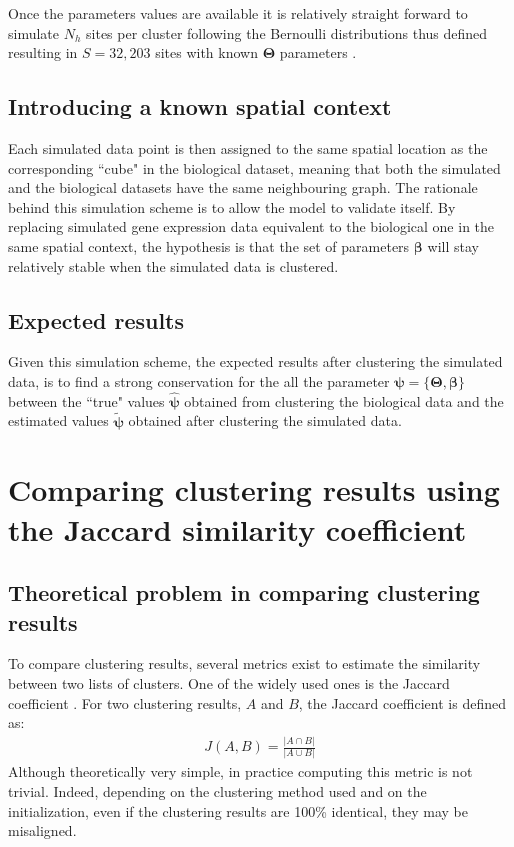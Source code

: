 	Once the parameters values are available it is relatively straight forward to simulate $N_h$ sites per cluster following the Bernoulli distributions thus defined resulting in $S=32,203$ sites with known $\boldsymbol{\Theta}$ parameters .
	\subsection{Introducing a known spatial context}\label{subsec:simul_spatial}
	Each simulated data point is then assigned to the same spatial location as the corresponding ``cube" in the biological dataset, meaning that both the simulated and the biological datasets have the same neighbouring graph. The rationale behind this simulation scheme is to allow the model to validate itself. By replacing simulated gene expression data equivalent to the biological one in the same spatial context, the hypothesis is that the set of parameters $\boldsymbol{\beta}$ will stay relatively stable when the simulated data is clustered.
	\subsection{Expected results}\label{subsec:expected_simul_results}
	Given this simulation scheme, the expected results after clustering the simulated data, is to find a strong conservation for the all the parameter $\boldsymbol{\psi} = \{\boldsymbol{\Theta},\boldsymbol{\beta}\}$ between the ``true" values $\hat{\boldsymbol{\psi}}$ obtained from clustering the biological data and the estimated values $\widetilde{\boldsymbol{\psi}}$ obtained after clustering the simulated data.\\

\section{Comparing clustering results using the Jaccard similarity coefficient}
	\subsection{Theoretical problem in comparing clustering results}
To compare clustering results, several metrics exist to estimate the similarity between two lists of clusters. One of the widely used ones is the Jaccard coefficient \cite{jaccard1901}. For two clustering results, $A$ and $B$, the Jaccard coefficient is defined as: 
\begin{align*}
J(A,B) = \frac{|A \cap B|}{|A \cup B|}
\end{align*}
Although theoretically very simple, in practice computing this metric is not trivial. Indeed, depending on the clustering method used and on the initialization, even if the clustering results are 100\% identical, they may be misaligned.\\

